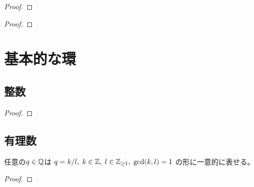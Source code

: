 \documentclass[report]{jlreq}
\begin{document}
\begin{proposition}[局所化のイデアル]
    \TODO{}
\end{proposition}

\begin{proof}
    \TODO{}
\end{proof}

\begin{theorem}[局所化の素イデアルの対応原理]
    \TODO{}
\end{theorem}

\begin{proof}
    \TODO{}
\end{proof}



%
\chapter{基本的な環}

%
\section{整数}


\begin{theorem}
    \TODO{}
\end{theorem}

\begin{proof}
    \TODO{}
\end{proof}



%
\section{有理数}

\begin{lemma}[有理数の表示]
    任意の$q \in \mathbb{Q}$は
    $q = k / l, \; k \in \mathbb{Z}, \; l \in \mathbb{Z}_{\ge 1}, \; \gcd(k, l) = 1$
    の形に一意的に表せる。
\end{lemma}

\begin{proof}
    \TODO{}
\end{proof}
\end{document}
